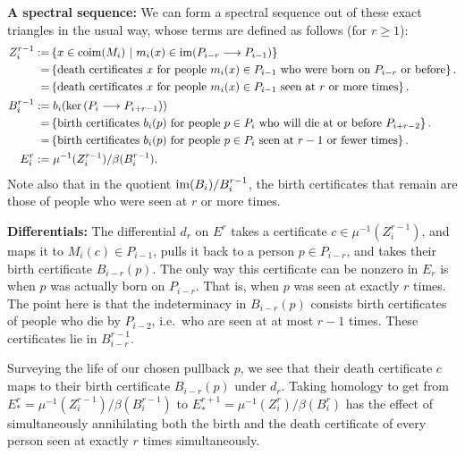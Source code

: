 \documentclass[11pt]{article}
\begin{document}
\Bullet \textbf{A spectral sequence:} We can form a spectral sequence out of
these exact triangles in the usual way, whose terms are defined as follows (for
$r\geq1$):
\begin{alignat*}{2}
Z_{i}^{r-1}:=&\left\{x\in \operatorname{coim}(M_i)\ \middle|\ m_i(x)\in\operatorname{im}(P_{i-r}\longrightarrow
P_{i-1})\right\}\\
=&\left\{\text{death certificates $x$ for people $m_i(x)\in P_{i-1}$ who were
born on $P_{i-r}$ or before}\right\}.\\
=&\left\{\text{death certificates $x$ for people $m_i(x)\in P_{i-1}$ seen at $r$
or more times}\right\}.\\
B_{i}^{r-1}:=&\left.b_i(\textup{ker}\,(P_i\longrightarrow P_{i+r-1}))\right.\\
=&\left\{\text{birth certificates $b_i(p)$ for people $p\in P_i$ who will die at
or before $P_{i+r-2}$}\right\}.\\
=&\left\{\text{birth certificates $b_i(p)$ for people $p\in P_i$ seen at $r-1$
or fewer times}\right\}.\\
E_{i}^{r}:=&\left.\mu^{-1}(Z_{i}^{r-1})/\beta(B_{i}^{r-1}).\right.
\end{alignat*}
Note also that in the quotient $\operatorname{im}(B_i)/B_i^{r-1}$, the birth certificates that
remain are those of people who were seen at $r$ or more times.

\Bullet \textbf{Differentials:} The differential $d_r$ on $E^{r}$ takes a
certificate $c\in\mu^{-1}(Z_i^{r-1})$, and maps it to $M_i(c)\in P_{i-1}$, pulls
it back to a person $p\in P_{i-r}$, and takes their birth certificate
$B_{i-r}(p)$. The only way this certificate can be nonzero in $E_r$ is when $p$
was actually born on $P_{i-r}$. That is, when $p$ was seen at exactly $r$ times.
The point here is that the indeterminacy in $B_{i-r}(p)$ consists birth
certificates of people who die by $P_{i-2}$, i.e.\ who are seen at at most $r-1$
times. These certificates lie in $B_{i-r}^{r-1}$.

Surveying the life of our chosen pullback $p$, we see that their death
certificate $c$ maps to their birth certificate $B_{i-r}(p)$ under $d_r$. Taking
homology to get from $E_*^r=\mu^{-1}(Z_{i}^{r-1})/\beta(B_{i}^{r-1})$ to
$E_*^{r+1}=\mu^{-1}(Z_{i}^{r})/\beta(B_{i}^{r})$ has the effect of
simultaneously annihilating both the birth and the death certificate of every
person seen at exactly $r$ times simultaneously.
\end{document}
